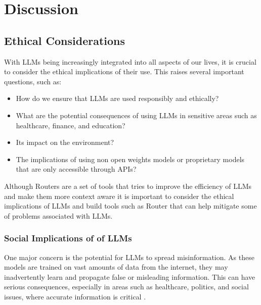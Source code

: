 \chapter{Discussion}
\label{ch:discussion}

\section{Ethical Considerations}
\label{sec:discussion-ethical-considerations}


With LLMs being increasingly integrated into all aspects of our lives, it is crucial to consider the ethical implications of their use. This raises several important questions, 
such as: 

\begin{itemize}
    \item How do we ensure that LLMs are used responsibly and ethically?
    \item What are the potential consequences of using LLMs in sensitive areas such as healthcare, finance, and education?
    \item Its impact on the environment?
    \item The implications of using non open weights models or proprietary models that are only accessible through APIs?
\end{itemize}

Although Routers are a set of tools that tries to improve the efficiency of LLMs and make them more context aware it is important to consider the ethical implications of LLMs and build tools such as Router that can help mitigate some of problems associated with LLMs.

\subsection{Social Implications of of LLMs}
\label{sec:discussion-social-implications-of-llms}

One major concern is the potential for LLMs to spread misinformation. As these models are trained on vast amounts of data from the internet, they may inadvertently learn and propagate false or misleading information. This can have serious consequences, especially in areas such as healthcare, politics, and social issues, where accurate information is critical \citep{strubell2019energypolicyconsiderationsdeep}.


